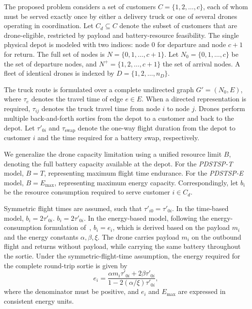 \documentclass[3p, authoryear, 11pt]{elsarticle}
\begin{document}
The proposed problem considers a set of customers $C = \{1, 2, \dots, c\}$, each of whom must be served exactly once by either a delivery truck or one of several drones operating in coordination. Let $C_d \subseteq C$ denote the subset of customers that are drone-eligible, restricted by payload and battery-resource feasibility. The single physical depot is modeled with two indices: node $0$ for departure and node $c+1$ for return. The full set of nodes is $N = \{0, 1, \dots, c+1\}$. Let $N_0 = \{0, 1, \dots, c\}$ be the set of departure nodes, and $N^+ = \{1, 2, \dots, c+1\}$ the set of arrival nodes. A fleet of identical drones is indexed by $D = \{1,2,\dots,n_D\}$.

The truck route is formulated over a complete undirected graph $G' = (N_0, E)$, where $\tau_e$ denotes the travel time of edge $e \in E$. When a directed representation is required, $\tau_{ij}$ denotes the truck travel time from node $i$ to node $j$. Drones perform multiple back-and-forth sorties from the depot to a customer and back to the depot. Let $\tau'_{0i}$ and $\tau_{\mathrm{swap}}$ denote the one-way flight duration from the depot to customer $i$ and the time required for a battery swap, respectively.

We generalize the drone capacity limitation using a unified
resource limit $B$, denoting the full battery capacity available
at the depot. For the \textit{PDSTSP-T} model, $B = T$,
representing maximum flight time endurance. For the
\textit{PDSTSP-E} model, $B = E_{\max}$, representing maximum
energy capacity. Correspondingly, let $b_i$ be the resource
consumption required to serve customer $i \in C_d$.


Symmetric flight times are assumed, such that
$\tau'_{i0} = \tau'_{0i}$. In the time-based model,
$b_i = 2\tau'_{0i}$.
$b_i = 2\tau'_{0i}$. In the energy-based model, following
the energy-consumption formulation
of~\citet{dorling_vehicle_2017}, $b_i = e_i$, which is derived
based on the payload $m_i$ and the energy constants
$\alpha, \beta, \xi$. The drone carries payload $m_i$ on the
outbound flight and returns without payload, while carrying
the same battery throughout the sortie. Under the
symmetric-flight-time assumption, the energy required for
the complete round-trip sortie is given by
\begin{equation}
    e_i
    = \frac{\alpha m_i\tau'_{0i} + 2\beta\tau'_{0i}}
    {1 - 2(\alpha/\xi)\tau'_{0i}},
    \label{eq:energy_consumption_def}
\end{equation}
where the denominator must be positive, and $e_i$ and
$E_{\max}$ are expressed in consistent energy units.
\end{document}
